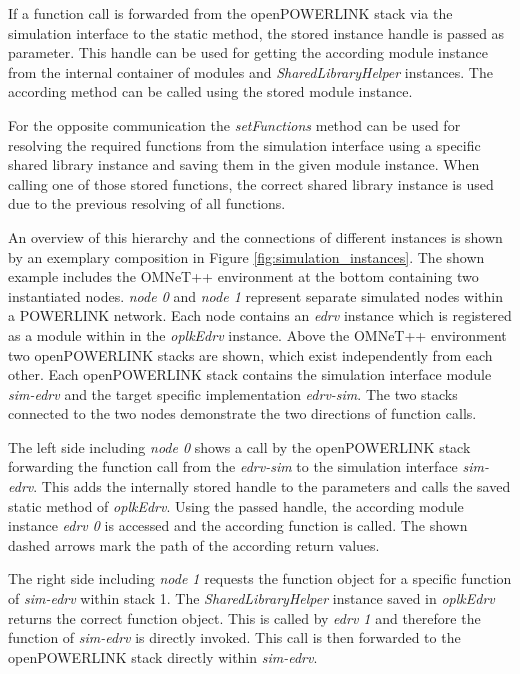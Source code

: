 If a function call is forwarded from the openPOWERLINK stack via the simulation interface to the static method, the stored instance handle is passed as parameter.
This handle can be used for getting the according module instance from the internal container of modules and \emph{SharedLibraryHelper} instances.
The according method can be called using the stored module instance.

For the opposite communication the \emph{setFunctions} method can be used for resolving the required functions from the simulation interface using a specific shared library instance and saving them in the given module instance.
When calling one of those stored functions, the correct shared library instance is used due to the previous resolving of all functions.

An overview of this hierarchy and the connections of different instances is shown by an exemplary composition in Figure \ref{fig:simulation_instances}.
The shown example includes the OMNeT++ environment at the bottom containing two instantiated nodes.
\emph{node 0} and \emph{node 1} represent separate simulated nodes within a POWERLINK network.
Each node contains an \emph{edrv} instance which is registered as a module within in the \emph{oplkEdrv} instance.
Above the OMNeT++ environment two openPOWERLINK stacks are shown, which exist independently from each other.
Each openPOWERLINK stack contains the simulation interface module \emph{sim-edrv} and the target specific implementation \emph{edrv-sim}.
The two stacks connected to the two nodes demonstrate the two directions of function calls.

The left side including \emph{node 0} shows a call by the openPOWERLINK stack forwarding the function call from the \emph{edrv-sim} to the simulation interface \emph{sim-edrv}.
This adds the internally stored handle to the parameters and calls the saved static method of \emph{oplkEdrv}.
Using the passed handle, the according module instance \emph{edrv 0} is accessed and the according function is called.
The shown dashed arrows mark the path of the according return values.

The right side including \emph{node 1} requests the function object for a specific function of \emph{sim-edrv} within stack 1.
The \emph{SharedLibraryHelper} instance saved in \emph{oplkEdrv} returns the correct function object.
This is called by \emph{edrv 1} and therefore the function of \emph{sim-edrv} is directly invoked.
This call is then forwarded to the openPOWERLINK stack directly within \emph{sim-edrv}.


